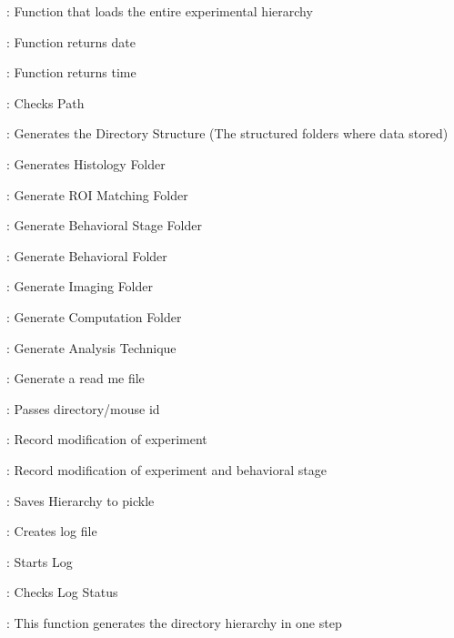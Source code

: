 \documentclass[letterpaper,10pt,english]{sphinxmanual}
\begin{document}
\begin{fulllineitems}
\begin{description}
\begin{DUlineblock}{0em}
\item[]  : Function that loads the entire experimental hierarchy
\item[] : Function returns date
\item[]  : Function returns time
\item[]  : Checks Path
\item[]  : Generates the Directory Structure (The structured folders where data stored)
\item[]  :  Generates Histology Folder
\item[]  : Generate ROI Matching Folder
\item[]  : Generate Behavioral Stage Folder
\item[]  : Generate Behavioral Folder
\item[]  : Generate Imaging Folder
\item[]  : Generate Computation Folder
\item[]  : Generate Analysis Technique
\end{DUlineblock}

\begin{DUlineblock}{0em}
\item[]  : Generate a read me file
\end{DUlineblock}

\begin{DUlineblock}{0em}
\item[]  : Passes directory/mouse id
\item[]  : Record modification of experiment
\item[]  : Record modification of experiment and behavioral stage
\item[]  : Saves Hierarchy to pickle
\item[]  : Creates log file
\item[]  : Starts Log
\item[]  : Checks Log Status
\item[]  : This function generates the directory hierarchy in one step
\end{DUlineblock}


\end{description}
\end{fulllineitems}
\end{document}
